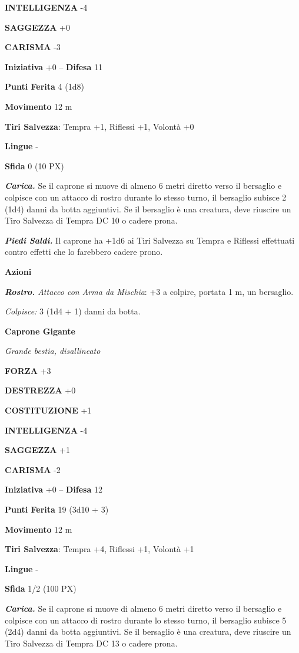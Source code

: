 \begin{multicols}{2}
\textbf{INTELLIGENZA} -4

\textbf{SAGGEZZA} +0

\textbf{CARISMA} -3

\textbf{Iniziativa} +0 -- \textbf{Difesa} 11

\textbf{Punti Ferita} 4 (1d8)

\textbf{Movimento} 12 m

\textbf{Tiri Salvezza}: Tempra +1, Riflessi +1, Volontà +0

\textbf{Lingue} -

\textbf{Sfida} 0 (10 PX)

\textit{\textbf{Carica.}} Se il caprone si muove di almeno 6 metri diretto verso il bersaglio e colpisce con un attacco di rostro durante lo stesso turno, il bersaglio subisce 2 (1d4) danni da botta aggiuntivi. Se il bersaglio è una creatura, deve riuscire un Tiro Salvezza di Tempra DC 10
o cadere prona.

\textit{\textbf{Piedi Saldi.}} Il caprone ha +1d6 ai Tiri Salvezza su Tempra e Riflessi effettuati contro effetti che lo farebbero cadere prono.

\textbf{Azioni}

\textit{\textbf{Rostro.} Attacco con Arma da Mischia}: +3 a colpire, portata 1 m, un bersaglio.

\textit{Colpisce:} 3 (1d4 + 1) danni da botta.

\medskip\textbf{Caprone Gigante}

\textit{Grande bestia, disallineato}

\textbf{FORZA} +3

\textbf{DESTREZZA} +0

\textbf{COSTITUZIONE} +1

\textbf{INTELLIGENZA} -4

\textbf{SAGGEZZA} +1

\textbf{CARISMA} -2

\textbf{Iniziativa} +0 -- \textbf{Difesa} 12

\textbf{Punti Ferita} 19 (3d10 + 3)

\textbf{Movimento} 12 m

\textbf{Tiri Salvezza}: Tempra +4, Riflessi +1, Volontà +1

\textbf{Lingue} -

\textbf{Sfida} 1/2 (100 PX)

\textit{\textbf{Carica.}} Se il caprone si muove di almeno 6 metri diretto verso il bersaglio e colpisce con un attacco di rostro durante lo stesso turno, il bersaglio subisce 5 (2d4) danni da botta aggiuntivi. Se il bersaglio è una creatura, deve riuscire un Tiro Salvezza di Tempra DC 13 o cadere prona.


\end{multicols}
